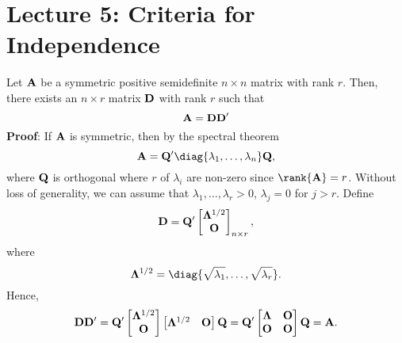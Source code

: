 \section{Lecture 5: Criteria for Independence}
\begin{Lemma}{}{}
    Let $ \mathbf{A} $ be a symmetric positive semidefinite
    $ n\times n $ matrix with rank $ r $. Then, there exists an $ n\times r $
    matrix $ \mathbf{D} $ with rank $ r $ such that
    \[ \mathbf{A}=\mathbf{DD}' \]
    \tcblower{}
    \textbf{Proof}: If $ \mathbf{A} $ is symmetric, then by the spectral theorem
    \[ \Matrix{A}=\Matrix{Q}'\diag{\lambda_1,\ldots,\lambda_n}\Matrix{Q}, \]
    where $ \mathbf{Q} $ is orthogonal where $ r $ of $ \lambda_i $ are non-zero since
    $ \rank{\Matrix{A}}=r $. Without loss of generality, we can assume that
    $ \lambda_1,\ldots,\lambda_r>0 $, $ \lambda_j=0 $ for $ j>r $.
    Define
    \[ \mathbf{D}=\mathbf{Q}'\begin{bmatrix}
            \mathbf{\Lambda}^{1/2} \\
            \mathbf{O}
        \end{bmatrix}_{n\times r}, \]
    where
    \[ \Matrix{\Lambda}^{1/2}=\diag{\sqrt{\lambda_1},\ldots,\sqrt{\lambda_r}}. \]
    Hence,
    \[ \mathbf{D}\mathbf{D}'=\mathbf{Q}'\begin{bmatrix}
            \mathbf{\Lambda}^{1/2} \\
            \mathbf{O}
        \end{bmatrix}\begin{bmatrix}
            \mathbf{\Lambda}^{1/2} & \mathbf{O}
        \end{bmatrix}\mathbf{Q}=
        \mathbf{Q}'\begin{bmatrix}
            \mathbf{\Lambda} & \mathbf{O} \\
            \mathbf{O}       & \mathbf{O}
        \end{bmatrix}\mathbf{Q}=\mathbf{A}. \]
\end{Lemma}
